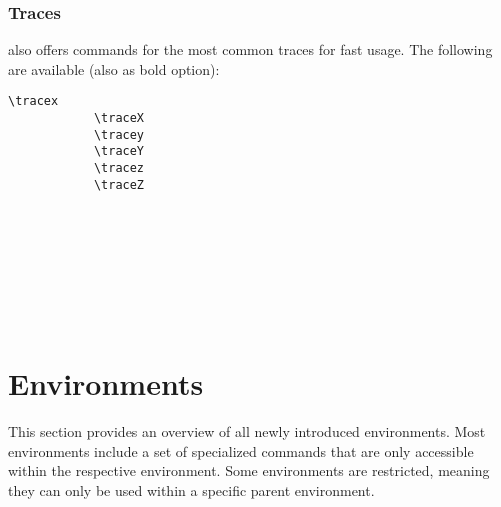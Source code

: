 \documentclass[10pt, a4paper]{article}
\begin{document}
	\subsubsection{Traces}
	\texttt{} also offers commands for the most common traces for fast usage. The following are available (also as bold option): 
	\begin{center}
		\begin{minipage}[h][3.2cm][t]{15em}
			\begin{lstlisting}[style=B]
			\tracex
			\traceX
			\tracey
			\traceY
			\tracez
			\traceZ	
			\end{lstlisting}
		\end{minipage}
		\begin{minipage}[h][3.2cm][t]{15em}
			\ \\
			\tracex\\
			\traceX\\
			\tracey\\
			\traceY\\
			\tracez\\
			\traceZ	
		\end{minipage}
	\end{center}
	\section{Environments}
	This section provides an overview of all newly introduced environments. Most environments include a set of specialized commands that are only accessible within the respective environment. Some environments are restricted, meaning they can only be used within a specific parent environment.
\end{document}
